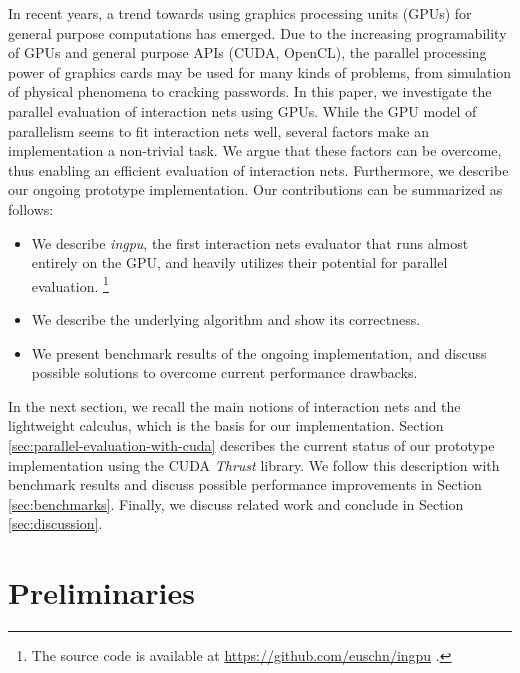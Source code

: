 \documentclass[submission,copyright,creativecommons]{eptcs}
\begin{document}
In recent years, a trend towards using graphics processing units (GPUs) for
general purpose computations has emerged. Due to the increasing programability
of GPUs and general purpose APIs (CUDA, OpenCL), the parallel processing
power of graphics cards may be used for many kinds of problems, from simulation
of physical phenomena to cracking passwords. In this paper, we investigate the
parallel evaluation of interaction nets using GPUs. While the GPU model of parallelism seems to fit interaction nets well, several factors make an implementation a
non-trivial task. We argue that these factors can be overcome, thus enabling an
efficient evaluation of interaction nets. Furthermore, we describe our ongoing
prototype implementation.
Our contributions can be summarized as follows:
\begin{itemize}
  \item We describe \emph{ingpu}, the first interaction nets evaluator that
  runs almost entirely on the GPU, and heavily utilizes their potential for
  parallel evaluation.%
  \footnote{The source code is available at
  \url{https://github.com/euschn/ingpu} .}
  \item We describe the underlying algorithm and show its correctness.
  \item We present benchmark results of the ongoing implementation, and discuss
  possible solutions to overcome current performance drawbacks.
\end{itemize}

In the
next section, we recall the main notions of interaction nets and the lightweight calculus, which is the basis for our implementation. Section
\ref{sec:parallel-evaluation-with-cuda} describes the current status of our
prototype implementation using the CUDA \emph{Thrust} library. We follow this
description with benchmark results and discuss possible performance
improvements in Section \ref{sec:benchmarks}.
Finally, we discuss related work and conclude in Section \ref{sec:discussion}.


\section{Preliminaries}
\label{sec:prelims}

\end{document}
